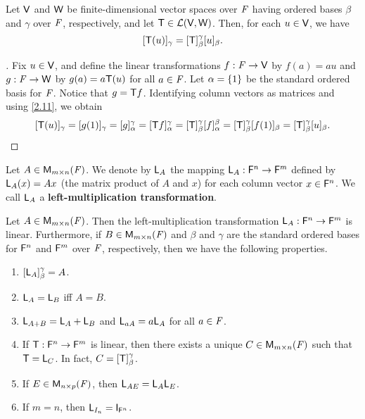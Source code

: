\begin{thm}\label{2.14}
	Let \(\mathsf{V}\) and \(\mathsf{W}\) be finite-dimensional vector spaces over \(\mathit{F}\) having ordered bases \(\beta\) and \(\gamma\) over \(\mathit{F}\), respectively, and let \(\mathsf{T} \in \mathcal{L}(\mathsf{V}, \mathsf{W})\).
	Then, for each \(u \in \mathsf{V}\), we have
	\[
		[\mathsf{T}(u)]_{\gamma} = [\mathsf{T}]_{\beta}^{\gamma} [u]_{\beta}.
	\]
\end{thm}

\begin{proof}[]
	Fix \(u \in \mathsf{V}\), and define the linear transformations \(f : \mathit{F} \to \mathsf{V}\) by \(f(a) = au\) and \(g : \mathit{F} \to \mathsf{W}\) by \(g(a) = a \mathsf{T}(u)\) for all \(a \in \mathit{F}\).
	Let \(\alpha = \left\lbrace1\right\rbrace\) be the standard ordered basis for \(\mathit{F}\).
	Notice that \(g = \mathsf{T} f\).
	Identifying column vectors as matrices and using \cref{2.11}, we obtain
	\[
		[\mathsf{T}(u)]_{\gamma} = [g(1)]_{\gamma} = [g]_{\alpha}^{\gamma} = [\mathsf{T} f]_{\alpha}^{\gamma} = [\mathsf{T}]_{\beta}^{\gamma} [f]_{\alpha}^{\beta} = [\mathsf{T}]_{\beta}^{\gamma} [f(1)]_{\beta} = [\mathsf{T}]_{\beta}^{\gamma} [u]_{\beta}.
	\]
\end{proof}

\begin{defn}\label{2.3.8}
	Let \(A \in \mathsf{M}_{{m} \times n}({\mathit{F}})\).
	We denote by \(\mathsf{L}_A\) the mapping \(\mathsf{L}_A : \mathsf{F}^n \to \mathsf{F}^m\) defined by \(\mathsf{L}_A(x) = Ax\) (the matrix product of \(A\) and \(x\)) for each column vector \(x \in \mathsf{F}^n\).
	We call \(\mathsf{L}_A\) a \textbf{left-multiplication transformation}.
\end{defn}

\begin{thm}\label{2.15}
	Let \(A \in \mathsf{M}_{{m} \times n}({\mathit{F}})\).
	Then the left-multiplication transformation \(\mathsf{L}_A : \mathsf{F}^n \to \mathsf{F}^m\) is linear.
	Furthermore, if \(B \in \mathsf{M}_{{m} \times n}({\mathit{F}})\) and \(\beta\) and \(\gamma\) are the standard ordered bases for \(\mathsf{F}^n\) and \(\mathsf{F}^m\) over \(\mathit{F}\), respectively, then we have the following properties.
	\begin{enumerate}
		\item \([\mathsf{L}_A]_{\beta}^{\gamma} = A\).
		\item \(\mathsf{L}_A = \mathsf{L}_B\) iff \(A = B\).
		\item \(\mathsf{L}_{A + B} = \mathsf{L}_A + \mathsf{L}_B\) and \(\mathsf{L}_{aA} = a \mathsf{L}_A\) for all \(a \in \mathit{F}\).
		\item If \(\mathsf{T} : \mathsf{F}^n \to \mathsf{F}^m\) is linear, then there exists a unique \(C \in \mathsf{M}_{{m} \times n}({\mathit{F}})\) such that \(\mathsf{T} = \mathsf{L}_C\).
		      In fact, \(C = [\mathsf{T}]_{\beta}^{\gamma}\).
		\item If \(E \in \mathsf{M}_{{n} \times p}({\mathit{F}})\), then \(\mathsf{L}_{AE} = \mathsf{L}_A \mathsf{L}_E\).
		\item If \(m = n\), then \(\L_{I_n} = \IT[\vs{F}^n]\).
	\end{enumerate}
\end{thm}

